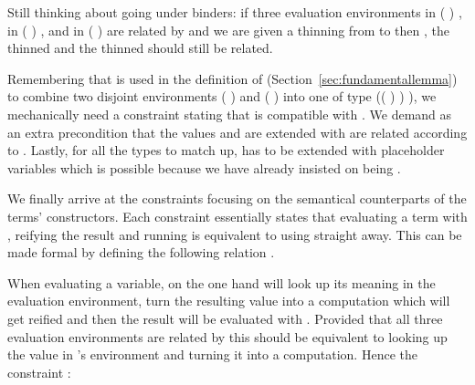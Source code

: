 \begin{agdasnippet}
\addtolength{\leftskip}{\parindent}
\end{agdasnippet}
Still thinking about going under binders: if three evaluation environments
 in {( )  },  in
{( )  }, and  in {( )  }
are related by  and we are given a thinning  from  to 
then , the thinned  and the thinned  should still be related.

\begin{agdasnippet}
\addtolength{\leftskip}{\parindent}
\end{agdasnippet}
Remembering that \AF{\_>>\_} is used in the definition of  (Section~\ref{sec:fundamentallemma}) to
combine two disjoint environments {( )  } and
{( )  } into one of type
{(( \AF{++} ) )  )}, we mechanically need a
constraint stating that \AF{\_>>\_} is compatible with . We demand
as an extra precondition that the values  and  are extended
with are related according to . Lastly, for all the types to match up,
 has to be extended with placeholder variables which is possible because
we have already insisted on  being .

\begin{agdasnippet}
\addtolength{\leftskip}{\parindent}
\end{agdasnippet}
We finally arrive at the constraints focusing on the semantical counterparts
of the terms' constructors. Each constraint essentially states that evaluating
a term with , reifying the result and running  is equivalent to
using  straight away. This can be made formal by defining the following
relation .

\begin{agdasnippet}
\addtolength{\leftskip}{\parindent}
\end{agdasnippet}
When evaluating a variable, on the one hand 
will look up its meaning in the evaluation environment, turn the resulting value into
a computation which will get reified and then the result will be evaluated with .
Provided that all three evaluation environments are related by  this should
be equivalent to looking up the value in 's environment and turning it into a
computation. Hence the constraint :

